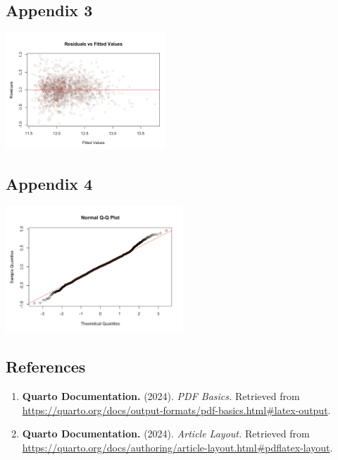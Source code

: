 \documentclass[
  twocolumn]{article}
\begin{document}
\subsection{Appendix 3}\label{appendix-3}

\includegraphics[width=0.45\textwidth,height=\textheight]{A3 Residuals.png}

\subsection{Appendix 4}\label{appendix-4}

\includegraphics[width=0.5\textwidth,height=\textheight]{A4 QQ-plot.png}

\subsection{References}\label{references}

\begin{enumerate}
\def\labelenumi{\arabic{enumi}.}
\item
  \textbf{Quarto Documentation.} (2024). \emph{PDF Basics.} Retrieved
  from
  \url{https://quarto.org/docs/output-formats/pdf-basics.html\#latex-output}.
\item
  \textbf{Quarto Documentation.} (2024). \emph{Article Layout.}
  Retrieved from
  \url{https://quarto.org/docs/authoring/article-layout.html\#pdflatex-layout}.
\end{enumerate}
\end{document}

